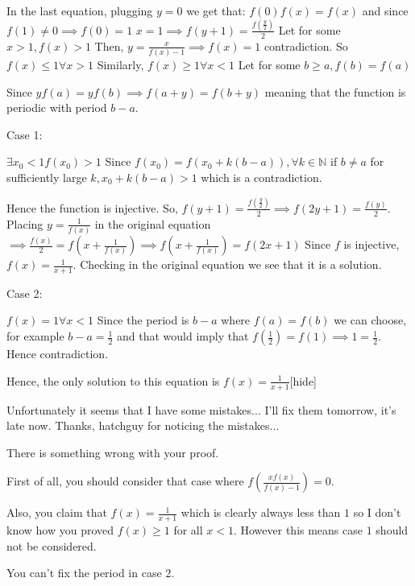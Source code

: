 \begin{solution}In the last equation, plugging $y=0$ we get that:
$f(0)f(x)=f(x)$ and since $f(1)\neq 0 \implies f(0)=1$
$x=1 \implies f(y+1)=\frac{f(\frac{y}{2})}{2}$
Let for some $x>1, f(x)>1$
Then, $y=\frac{x}{f(x)-1} \implies f(x)=1$ contradiction. So $f(x)\leq 1 \forall x>1$
Similarly, $f(x)\geq 1 \forall x<1$
Let for some $b\geq a, f(b)=f(a)$

Since $yf(a)=yf(b) \implies  f(a+y)=f(b+y)$ meaning that the function is periodic with period $b-a$.

\begin{bolded}Case 1:\end{bolded} $\exists x_{0}<1 f(x_{0})>1$
Since $f(x_{0})=f(x_{0}+k(b-a)), \forall k\in\mathbb{N}$ if $b\neq a$ for sufficiently large $k, x_{0}+k(b-a)>1$ which is a contradiction.

Hence the function is injective. 
So, $ f(y+1)=\frac{f(\frac{y}{2})}{2} \implies  f(2y+1)=\frac{f(y)}{2}$.
Placing $y=\frac{1}{f(x)}$ in the original equation $\implies \frac{f(x)}{2}=f(x+\frac{1}{f(x)}) \implies f(x+\frac{1}{f(x)})=f(2x+1)$ Since $f$ is injective, $f(x)=\frac{1}{x+1}$. Checking in the original equation we see that it is a solution.

\begin{bolded}Case 2:\end{bolded} $f(x)=1 \forall x<1$
Since the period is $b-a$ where $f(a)=f(b)$ we can choose, for example $b-a=\frac{1}{2}$ and that would imply that $f(\frac{1}{2})=f(1)\implies 1=\frac{1}{2}$. Hence contradiction.

Hence, the only solution to this equation is $\boxed{f(x)=\frac{1}{x+1}}$[\/hide]

Unfortunately it seems that I have some mistakes... I'll fix them tomorrow, it's late now.
Thanks, hatchguy for noticing the mistakes...
\end{solution}



\begin{solution}
	There is something wrong with your proof.

First of all, you should consider that case where $f(\frac{xf(x)}{f(x)-1}) = 0$.

Also, you claim that $f(x) = \frac{1}{x+1}$ which is clearly always less than $1$ so I don't know how you proved $f(x) \ge 1$ for all $x< 1$.  However this means case $1$ should not be considered.

You can't fix the period in case $2$.
\end{solution}



